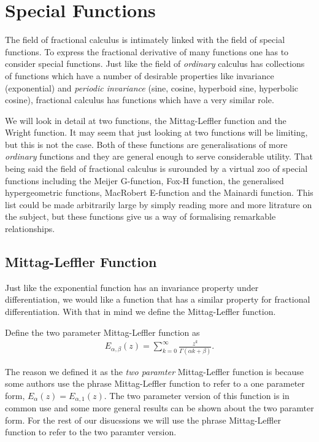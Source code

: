 
\section{Special Functions}

The field of fractional calculus is intimately linked with the field of special functions. To express the fractional derivative
of many functions one has to consider special functions. Just like the field of \emph{ordinary} calculus has collections of functions which have a number of desirable properties like invariance (exponential) and \emph{periodic invariance} (sine, cosine, hyperboid sine, hyperbolic cosine), fractional calculus has functions which have a very similar role.

We will look in detail at two functions, the Mittag-Leffler function and the Wright function. It may seem that just looking at two functions will be limiting, but this is not the case. Both of these functions are generalisations of more \emph{ordinary} functions and they are general enough to serve considerable utility. That being said the field of fractional calculus is surounded by a virtual zoo of special functions including the Meijer G-function, Fox-H function, the generalised hypergeometric functions, MacRobert E-function and the Mainardi function. This list could be made arbitrarily large by simply reading more and more litrature on the subject, but these functions give us a way of formalising remarkable relationships.

\subsection{Mittag-Leffler Function}

Just like the exponential function has an invariance property under differentiation, we would like a function that has a similar property for fractional differentiation. With that in mind we define the Mittag-Leffler function.

\begin{definition}
    Define the two parameter Mittag-Leffler function as
    \begin{align}
        E_{\alpha, \beta}(z) = \sum_{k=0}^\infty \frac{z^k}{\Gamma(\alpha k + \beta)}.
    \end{align}
\end{definition}
The reason we defined it as the \emph{two paramter} Mittag-Leffler function is because some authors use the phrase Mittag-Leffler function to refer to a one parameter form, $ E_{\alpha}(z) = E_{\alpha, 1}(z) $. The two parameter version of this function is in common use and some more general results can be shown about the two paramter form. For the rest of our disucssions we will use the phrase Mittag-Leffler function to refer to the two paramter version.

